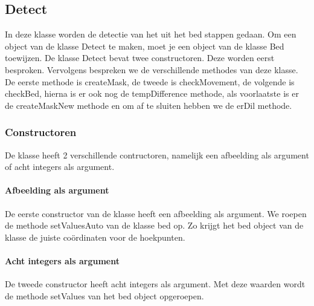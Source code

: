 \subsection{Detect}
\label{mRefDet}
In deze klasse worden de detectie van het uit het bed stappen gedaan. Om een object van de klasse Detect te maken, moet je een object van de klasse Bed toewijzen. De klasse Detect bevat twee constructoren. Deze worden eerst besproken. Vervolgens bespreken we de verschillende methodes van deze klasse. De eerste methode is createMask, de tweede is checkMovement, de volgende is checkBed, hierna is er ook nog de tempDifference methode, als voorlaatste is er de createMaskNew methode en om af te sluiten hebben we de erDil methode.

\subsubsection{Constructoren}
De klasse heeft 2 verschillende contructoren, namelijk een afbeelding als argument of acht integers als argument.

\paragraph{Afbeelding als argument}
De eerste constructor van de klasse heeft een afbeelding als argument. We  roepen de methode setValuesAuto van de klasse bed op. Zo krijgt het bed object van de klasse de juiste co\"ordinaten voor de hoekpunten. 

\paragraph{Acht integers als argument}
De tweede constructor heeft acht integers als argument. Met deze waarden wordt de methode setValues van het bed object opgeroepen.

